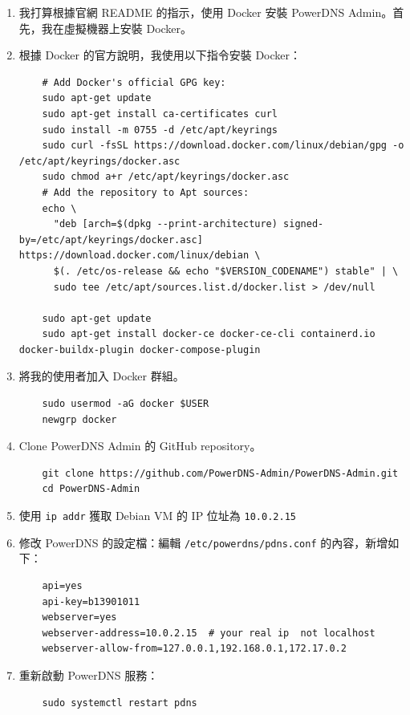 \documentclass[12pt]{article}
\begin{document}
\begin{enumerate}
  \item 我打算根據官網 README 的指示，使用 Docker 安裝 PowerDNS Admin。首先，我在虛擬機器上安裝 Docker。
  \item 根據 Docker 的官方說明，我使用以下指令安裝 Docker：
  \begin{verbatim}
    # Add Docker's official GPG key:
    sudo apt-get update
    sudo apt-get install ca-certificates curl
    sudo install -m 0755 -d /etc/apt/keyrings
    sudo curl -fsSL https://download.docker.com/linux/debian/gpg -o /etc/apt/keyrings/docker.asc
    sudo chmod a+r /etc/apt/keyrings/docker.asc
    # Add the repository to Apt sources:
    echo \
      "deb [arch=$(dpkg --print-architecture) signed-by=/etc/apt/keyrings/docker.asc] https://download.docker.com/linux/debian \
      $(. /etc/os-release && echo "$VERSION_CODENAME") stable" | \
      sudo tee /etc/apt/sources.list.d/docker.list > /dev/null

    sudo apt-get update
    sudo apt-get install docker-ce docker-ce-cli containerd.io docker-buildx-plugin docker-compose-plugin
  \end{verbatim}
  \item 將我的使用者加入 Docker 群組。
  \begin{verbatim}
    sudo usermod -aG docker $USER
    newgrp docker
  \end{verbatim}
  \item Clone PowerDNS Admin 的 GitHub repository。
  \begin{verbatim}
    git clone https://github.com/PowerDNS-Admin/PowerDNS-Admin.git
    cd PowerDNS-Admin
  \end{verbatim}

  \item 使用 \texttt{ip addr} 獲取 Debian VM 的 IP 位址為 \texttt{10.0.2.15}
  \item 修改 PowerDNS 的設定檔：編輯 \texttt{/etc/powerdns/pdns.conf} 的內容，新增如下：
  \begin{verbatim}
    api=yes
    api-key=b13901011
    webserver=yes
    webserver-address=10.0.2.15  # your real ip  not localhost
    webserver-allow-from=127.0.0.1,192.168.0.1,172.17.0.2
  \end{verbatim}
  \item 重新啟動 PowerDNS 服務：
  \begin{verbatim}
    sudo systemctl restart pdns
  \end{verbatim}


\end{enumerate}
\end{document}
